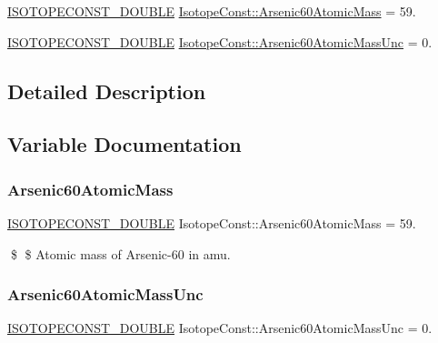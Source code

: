 \begin{DoxyCompactItemize}
\item 
\mbox{\hyperlink{group___isotope_const-_macros_ga8f45a7272ce02c0b4c65c44636ed719a}{I\+S\+O\+T\+O\+P\+E\+C\+O\+N\+S\+T\+\_\+\+D\+O\+U\+B\+LE}} \mbox{\hyperlink{group___isotope_const-_arsenic-_as60_gae90f335a050a4b5ea29a2cdb8f8ebbc4}{Isotope\+Const\+::\+Arsenic60\+Atomic\+Mass}} = 59.
\item 
\mbox{\hyperlink{group___isotope_const-_macros_ga8f45a7272ce02c0b4c65c44636ed719a}{I\+S\+O\+T\+O\+P\+E\+C\+O\+N\+S\+T\+\_\+\+D\+O\+U\+B\+LE}} \mbox{\hyperlink{group___isotope_const-_arsenic-_as60_gab6c42cbd7d9da0989f173a5ce6567fa1}{Isotope\+Const\+::\+Arsenic60\+Atomic\+Mass\+Unc}} = 0.
\end{DoxyCompactItemize}


\subsection{Detailed Description}


\subsection{Variable Documentation}
\mbox{\label{group___isotope_const-_arsenic-_as60_gae90f335a050a4b5ea29a2cdb8f8ebbc4}} 
\subsubsection{\texorpdfstring{Arsenic60\+Atomic\+Mass}{Arsenic60AtomicMass}}
{\footnotesize\ttfamily \mbox{\hyperlink{group___isotope_const-_macros_ga8f45a7272ce02c0b4c65c44636ed719a}{I\+S\+O\+T\+O\+P\+E\+C\+O\+N\+S\+T\+\_\+\+D\+O\+U\+B\+LE}} Isotope\+Const\+::\+Arsenic60\+Atomic\+Mass = 59.}

\$ \$ Atomic mass of Arsenic-\/60 in amu. \mbox{\label{group___isotope_const-_arsenic-_as60_gab6c42cbd7d9da0989f173a5ce6567fa1}} 
\subsubsection{\texorpdfstring{Arsenic60\+Atomic\+Mass\+Unc}{Arsenic60AtomicMassUnc}}
{\footnotesize\ttfamily \mbox{\hyperlink{group___isotope_const-_macros_ga8f45a7272ce02c0b4c65c44636ed719a}{I\+S\+O\+T\+O\+P\+E\+C\+O\+N\+S\+T\+\_\+\+D\+O\+U\+B\+LE}} Isotope\+Const\+::\+Arsenic60\+Atomic\+Mass\+Unc = 0.}

